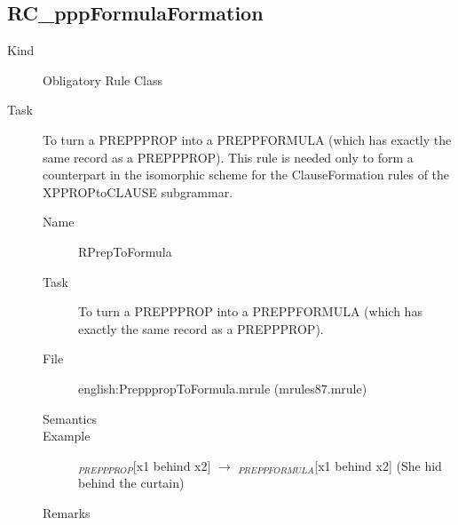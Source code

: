 \subsection{RC\_pppFormulaFormation}
\begin{description}
\item[Kind] Obligatory Rule Class
\item[Task] To turn a PREPPPROP into a PREPPFORMULA (which has exactly the same 
record as a PREPPPROP). This rule is needed only to form a counterpart in the 
isomorphic scheme for the ClauseFormation rules of the XPPROPtoCLAUSE 
subgrammar.

\vspace{1 cm}
\begin{description}
\item[Name] RPrepToFormula
\item[Task] To turn a PREPPPROP into a PREPPFORMULA (which has exactly the same 
record as a PREPPPROP). 
\item[File] english:PrepppropToFormula.mrule (mrules87.mrule)
\item[Semantics]
\item[Example] $_{PREPPPROP}$[x1 behind x2] $\rightarrow$ $_{PREPPFORMULA}$[x1 
behind x2] (She hid behind the curtain)
\item[Remarks] 
\end{description}

\end{description}

\newpage
